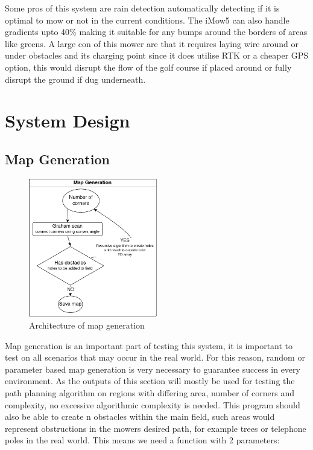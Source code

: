 \documentclass[final]{cmpreport_02}
\begin{document}
Some pros of this system are rain detection automatically detecting if it is optimal to mow or not in the current conditions. The iMow5 can also handle gradients upto 40\% making it suitable for any bumps around the borders of areas like greens.
A large con of this mower are that it requires laying wire around or under obstacles and its charging point since it does utilise RTK or a cheaper GPS option, this would disrupt the flow of the golf course if placed around or fully disrupt the ground if dug underneath.


\section{System Design}

\subsection{Map Generation}


\begin{figure}[H]
	\centering
	\includegraphics[width=0.5\textwidth]{./images/mapGen.drawio.png}
	\caption{Architecture of map generation}
	\label{MG:arch}
\end{figure}


Map generation is an important part of testing this system, it is important to test on all scenarios that may occur in the real world.
For this reason, random or parameter based map generation is very necessary to guarantee success in every environment.
As the outputs of this section will mostly be used for testing the path planning algorithm on regions with differing area, number of corners and complexity, no excessive algorithmic complexity is needed.
This program should also be able to create n obstacles within the main field, such areas would represent obstructions in the mowers desired path, for example trees or telephone poles in the real world.
This means we need a function with 2 parameters:
\end{document}
